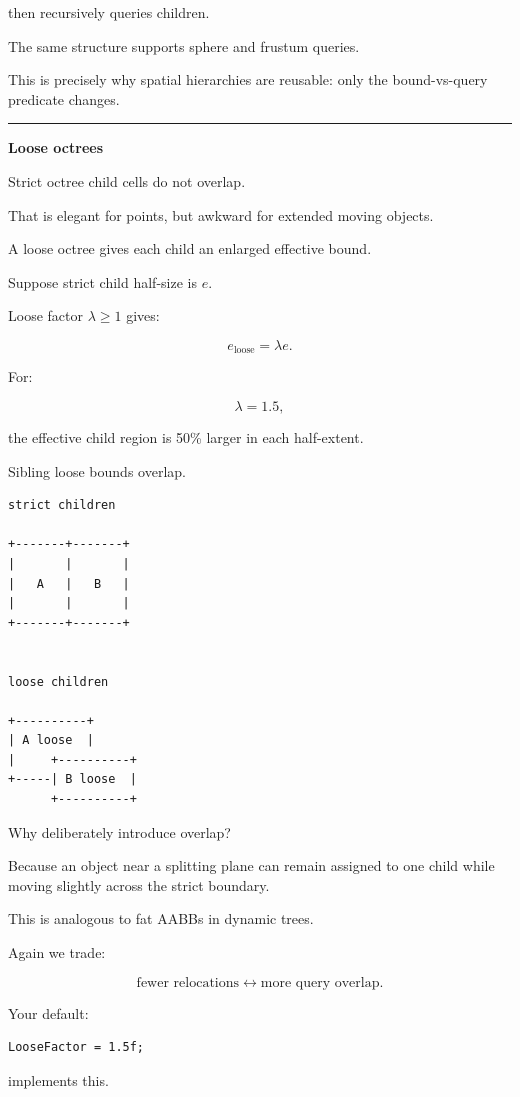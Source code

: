 then recursively queries children.

The same structure supports sphere and frustum queries.

This is precisely why spatial hierarchies are reusable: only the bound-vs-query predicate changes.

\begin{center}\rule{0.5\linewidth}{0.5pt}\end{center}

\textbf{Loose octrees}

Strict octree child cells do not overlap.

That is elegant for points, but awkward for extended moving objects.

A loose octree gives each child an enlarged effective bound.

Suppose strict child half-size is \(e\).

Loose factor \(\lambda\ge1\) gives:

\[
e_{\text{loose}}
=
\lambda e.
\]

For:

\[
\lambda=1.5,
\]

the effective child region is 50\% larger in each half-extent.

Sibling loose bounds overlap.

\begin{verbatim}
strict children

+-------+-------+
|       |       |
|   A   |   B   |
|       |       |
+-------+-------+


loose children

+----------+
| A loose  |
|     +----------+
+-----| B loose  |
      +----------+
\end{verbatim}

Why deliberately introduce overlap?

Because an object near a splitting plane can remain assigned to one child while moving slightly across the strict boundary.

This is analogous to fat AABBs in dynamic trees.

Again we trade:

\[
\text{fewer relocations}
\leftrightarrow
\text{more query overlap}.
\]

Your default:

\begin{verbatim}
LooseFactor = 1.5f;
\end{verbatim}

implements this.

